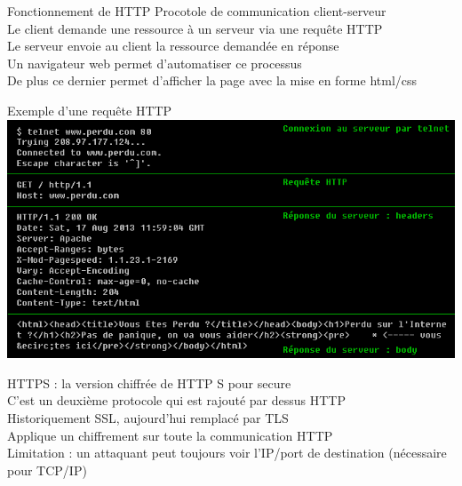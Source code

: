 \documentclass{bredelebeamer}
\begin{document}

\begin{frame}{Fonctionnement de HTTP}
    Procotole de communication client-serveur \\
    Le client demande une ressource à un serveur via une requête HTTP \\
    Le serveur envoie au client la ressource demandée en réponse \\
    Un navigateur web permet d'automatiser ce processus \\
    De plus ce dernier permet d'afficher la page avec la mise en forme html/css

\end{frame}


\begin{frame}{Exemple d'une requête HTTP}
    \includegraphics[width=\linewidth]{../medias/perdu.png}
\end{frame}


\begin{frame}{HTTPS : la version chiffrée de HTTP}
    S pour secure \\
    C'est un deuxième protocole qui est rajouté par dessus HTTP \\
    Historiquement SSL, aujourd'hui remplacé par TLS \\
    Applique un chiffrement sur toute la communication HTTP \\

    Limitation : un attaquant peut toujours voir l'IP/port de destination (nécessaire pour TCP/IP)
\end{frame}
\end{document}
